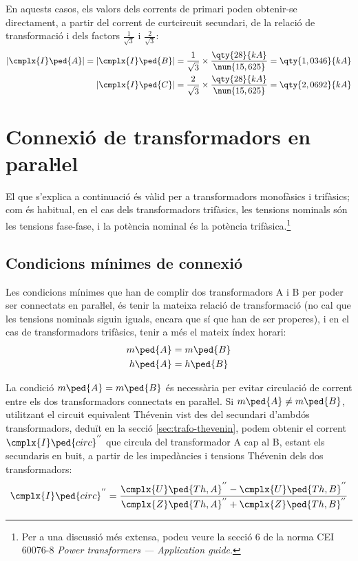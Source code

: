 \begin{exemple}[\CCasimSecTrafo{}]
     En aquests casos, els valors dels corrents de primari poden obtenir-se directament, a partir del corrent de curtcircuit secundari, de la relació de transformació i dels factors $\frac{1}{\sqrt{3}}$ i  $\frac{2}{\sqrt{3}}$:
    \begin{align*}
        |\cmplx{I}\ped{A}| = |\cmplx{I}\ped{B}| = \frac{1}{\sqrt{3}} \times \frac{\qty{28}{kA}}{\num{15,625}} = \qty{1,0346}{kA} \\
        |\cmplx{I}\ped{C}|= \frac{2}{\sqrt{3}} \times \frac{\qty{28}{kA}}{\num{15,625}} = \qty{2,0692}{kA}
    \end{align*}

\end{exemple}



\section{Connexió de transformadors en paraŀlel}

El que s'explica a continuació és vàlid per a transformadors
monofàsics i trifàsics; com és habitual, en el cas dels
transformadors trifàsics, les tensions nominals són les tensions
fase-fase, i la potència nominal és la potència trifàsica.\footnote{Per a una discussió més extensa,  podeu veure la secció 6 de la norma CEI 60076-8 \emph{Power transformers --- Application guide}.}

\subsection{Condicions mínimes de connexió}

Les condicions mínimes que han de complir dos transformadors A i B per poder ser connectats en paraŀlel, és tenir la mateixa relació de transformació (no cal que les tensions nominals siguin iguals, encara que sí que han de ser properes), i en el cas de transformadors trifàsics, tenir a més el mateix índex horari:
\begin{align}
    m\ped{A} &= m\ped{B}\label{eq:connex-min-1}\\
    h\ped{A} &= h\ped{B}\label{eq:connex-min-2}
\end{align}

La condició $m\ped{A} = m\ped{B}$ és necessària per evitar circulació de corrent entre els dos transformadors connectats en paraŀlel. Si $m\ped{A} \neq m\ped{B}$, utilitzant el circuit equivalent  Thévenin vist des del secundari d'ambdós transformadors, deduït en la secció \vref{sec:trafo-thevenin}, podem obtenir el corrent $\cmplx{I}\ped{circ}^{''}$ que circula del transformador A cap al B, estant els secundaris en buit, a partir de les impedàncies i tensions Thévenin dels dos transformadors:
\begin{equation}
    \cmplx{I}\ped{circ}^{''} = \frac{\cmplx{U}\ped{Th,A}^{''}-\cmplx{U}\ped{Th,B}^{''}}{\cmplx{Z}\ped{Th,A}^{''}+
    \cmplx{Z}\ped{Th,B}^{''}}
\end{equation}

